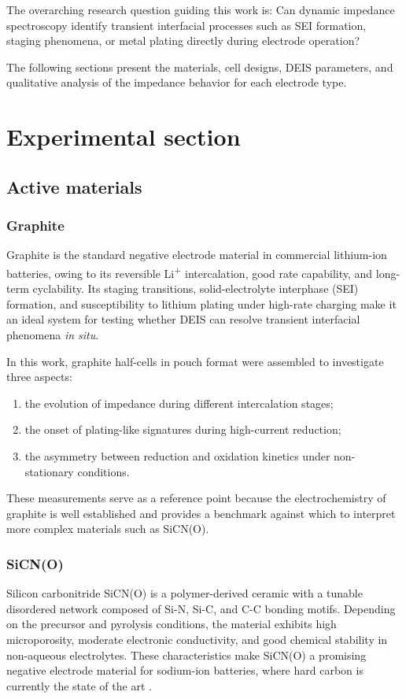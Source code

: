 The overarching research question guiding this work is:
Can dynamic impedance spectroscopy identify transient interfacial processes such as SEI formation, staging phenomena, or metal plating directly during electrode operation?

The following sections present the materials, cell designs, DEIS parameters, and qualitative analysis of the impedance behavior for each electrode type.

\section{Experimental section}
\subsection{Active materials}
\subsubsection{Graphite}
Graphite is the standard negative electrode material in commercial lithium-ion batteries, owing to its reversible Li\textsuperscript{+} intercalation, good rate capability, and long-term cyclability.  
Its staging transitions, solid-electrolyte interphase (SEI) formation, and susceptibility to lithium plating under high-rate charging make it an ideal system for testing whether DEIS can resolve transient interfacial phenomena \emph{in situ}.

In this work, graphite half-cells in pouch format were assembled to investigate three aspects:
\begin{enumerate}
    \item the evolution of impedance during different intercalation stages;
    \item the onset of plating-like signatures during high-current reduction;
    \item the asymmetry between reduction and oxidation kinetics under non-stationary conditions.
\end{enumerate}
These measurements serve as a reference point because the electrochemistry of graphite is well established and provides a benchmark against which to interpret more complex materials such as SiCN(O).

\subsubsection{SiCN(O)}

Silicon carbonitride SiCN(O) is a polymer-derived ceramic with a tunable disordered network composed of Si-N, Si-C, and C-C bonding motifs.  
Depending on the precursor and pyrolysis conditions, the material exhibits high microporosity, moderate electronic conductivity, and good chemical stability in non-aqueous electrolytes.  
These characteristics make SiCN(O) a promising negative electrode material for sodium-ion batteries, where hard carbon is currently the state of the art \cite{liuReviewHardCarbon2025}.

